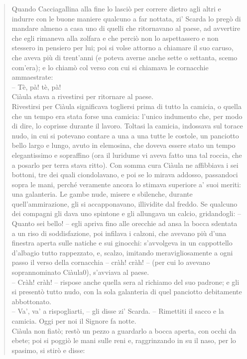 \documentclass[a4paper, twoside, titlepage]{book}
\newcounter{mar}
\begin{document}
\begin{quotation}
Quando Cacciagallina alla fine lo lasciò per correre dietro agli altri e indurre con le buone maniere qualcuno a far nottata, zi’ Scarda lo pregò di mandare almeno a casa uno di quelli che ritornavano al paese, ad avvertire che egli rimaneva alla zolfara e che perciò non lo aspettassero e non stessero in pensiero per lui; poi si volse attorno a chiamare il suo caruso, che aveva più di trent’anni (e poteva averne anche sette o settanta, scemo com’era); e lo chiamò col verso con cui si chiamava le cornacchie ammaestrate:\\
– Tè, pà! tè, pà!\\
Ciàula stava a rivestirsi per ritornare al paese.\\
Rivestirsi per Ciàula significava togliersi prima di tutto la camicia, o quella che un tempo era stata forse una camicia: l’unico indumento che, per modo di dire, lo coprisse durante il lavoro. Toltasi la camicia, indossava sul torace nudo, in cui si poteva­no contare a una a una tutte le costole, un panciotto bello largo e lungo, avuto in elemosina, che doveva essere stato un tempo elegantissimo e sopraffino (ora il luridume vi aveva fatto una tal roccia, che a posarlo per terra stava ritto). Con somma cura Ciàula ne affibbiava i sei bottoni, tre dei quali ciondolavano, e poi se lo mirava addosso, passandoci sopra le mani, perché veramente ancora lo stimava superiore a’ suoi meriti: una galanteria. Le gambe nude, misere e sbilenche, durante quell’ammirazione, gli si accapponavano, illividite dal freddo. Se qualcuno dei compagni gli dava uno spintone e gli allungava un calcio, gridandogli: – Quanto sei bello! – egli apriva fino alle orecchie ad ansa la bocca sdentata a un riso di soddisfazione, poi infilava i calzoni, che avevano più d’una finestra aperta sulle natiche e sui ginocchi: s’avvolgeva in un cappottello d’albagio tutto rappezzato, e, scalzo, imitando meravigliosamente a ogni passo il verso della cornacchia – cràh! cràh! – (per cui lo avevano soprannominato Ciàula0), s’avviava al paese.\\
– Cràh! cràh! – rispose anche quella sera al richiamo del suo padrone; e gli si pre­sentò tutto nudo, con la sola galanteria di quel panciotto debitamente abbottonato.\\
– Va’, va’ a rispogliarti, – gli disse zi’ Scarda. – Rimettiti il sacco e la camicia. Oggi per noi il Signore fa notte.\\
Ciàula non fiatò; restò un pezzo a guardarlo a bocca aperta, con occhi da ebete; poi si poggiò le mani sulle reni e, raggrinzando in su il naso, per lo spasimo, si stirò e disse:\\

\end{quotation}
\end{document}
